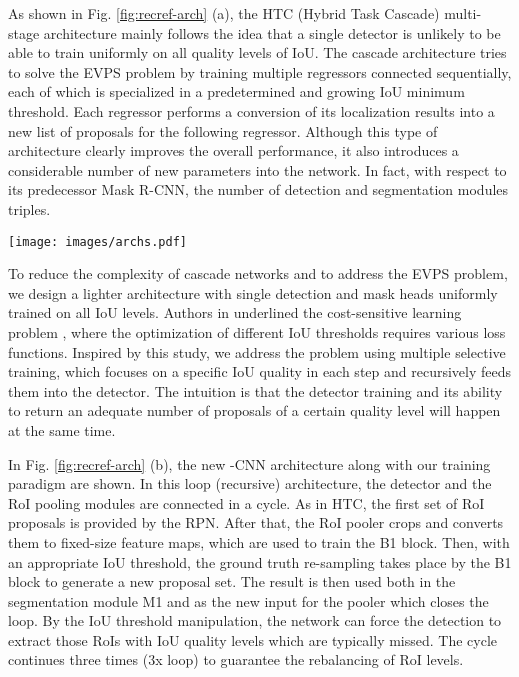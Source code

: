\documentclass[runningheads, orivec]{llncs}
\begin{document}
As shown in Fig. \ref{fig:recref-arch} (a), the HTC (Hybrid Task Cascade) multi-stage architecture \cite{chen2019hybrid} mainly follows the idea that a single detector is unlikely to be able to train uniformly on all quality levels of IoU.
The cascade architecture tries to solve the EVPS problem by training multiple regressors connected sequentially, each of which is specialized in a predetermined and growing IoU minimum threshold.
Each regressor performs a conversion of its localization results into a new list of proposals for the following regressor.
Although this type of architecture clearly improves the overall performance, it also introduces a considerable number of new parameters into the network.
In fact, with respect to its predecessor Mask R-CNN, the number of detection and segmentation modules triples.
\begin{figure*}[t]
	\begin{center}
		\texttt{[image: images/archs.pdf]}
	\end{center}
	\caption{Network design. (a) HTC: a multi-stage network which trains each head in a cascade fashion. (b) -CNN: our architecture which introduces a loop mechanism to self-train the heads.}
	\label{fig:recref-arch}
\end{figure*}
To reduce the complexity of cascade networks and to address the EVPS problem, we design a lighter architecture with single detection and mask heads uniformly trained on all IoU levels.
Authors in \cite{Cai_2018_CVPR} underlined the cost-sensitive learning problem \cite{elkan2001foundations, masnadi2010cost}, where the optimization of different IoU thresholds requires various loss functions.
Inspired by this study, we address the problem using multiple selective training, which focuses on a specific IoU quality in each step and recursively feeds them into the detector.
The intuition is that the detector training and its ability to return an adequate number of proposals of a certain quality level will happen at the same time.

In Fig. \ref{fig:recref-arch} (b), the new -CNN architecture along with our training paradigm are shown.
In this loop (recursive) architecture, the detector and the RoI pooling modules are connected in a cycle.
As in HTC, the first set of RoI proposals is provided by the RPN.
After that, the RoI pooler crops and converts them to fixed-size feature maps, which are used to train the B1 block.
Then, with an appropriate IoU threshold, the ground truth re-sampling takes place by the B1 block to generate a new proposal set.
The result is then used both in the segmentation module M1 and as the new input for the pooler which closes the loop.
By the IoU threshold manipulation, the network can force the detection to extract those RoIs with IoU quality levels which are typically missed.
The cycle continues three times (3x loop) to guarantee the rebalancing of RoI levels.
\end{document}
